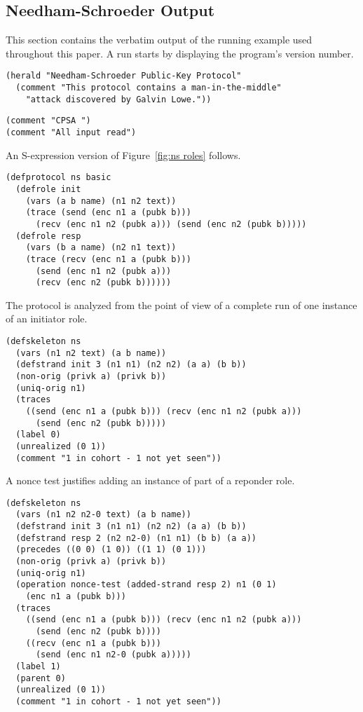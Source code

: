 \documentclass[12pt]{article}
\begin{document}
\subsection{Needham-Schroeder Output}


This section contains the verbatim output of the running example used
throughout this paper.  A run starts by displaying the program's
version number.

\begin{verbatim}
(herald "Needham-Schroeder Public-Key Protocol"
  (comment "This protocol contains a man-in-the-middle"
    "attack discovered by Galvin Lowe."))
\end{verbatim}

\begin{flushleft}
\texttt{(comment "CPSA {\version}")}\\
\texttt{(comment "All input read")}
\end{flushleft}

An S-expression version of Figure~\ref{fig:ns roles} follows.

\begin{verbatim}
(defprotocol ns basic
  (defrole init
    (vars (a b name) (n1 n2 text))
    (trace (send (enc n1 a (pubk b)))
      (recv (enc n1 n2 (pubk a))) (send (enc n2 (pubk b)))))
  (defrole resp
    (vars (b a name) (n2 n1 text))
    (trace (recv (enc n1 a (pubk b)))
      (send (enc n1 n2 (pubk a)))
      (recv (enc n2 (pubk b))))))
\end{verbatim}

The protocol is analyzed from the point of view of a complete run of
one instance of an initiator role.

\begin{verbatim}
(defskeleton ns
  (vars (n1 n2 text) (a b name))
  (defstrand init 3 (n1 n1) (n2 n2) (a a) (b b))
  (non-orig (privk a) (privk b))
  (uniq-orig n1)
  (traces
    ((send (enc n1 a (pubk b))) (recv (enc n1 n2 (pubk a)))
      (send (enc n2 (pubk b)))))
  (label 0)
  (unrealized (0 1))
  (comment "1 in cohort - 1 not yet seen"))
\end{verbatim}

A nonce test justifies adding an instance of part of a reponder role.

\begin{verbatim}
(defskeleton ns
  (vars (n1 n2 n2-0 text) (a b name))
  (defstrand init 3 (n1 n1) (n2 n2) (a a) (b b))
  (defstrand resp 2 (n2 n2-0) (n1 n1) (b b) (a a))
  (precedes ((0 0) (1 0)) ((1 1) (0 1)))
  (non-orig (privk a) (privk b))
  (uniq-orig n1)
  (operation nonce-test (added-strand resp 2) n1 (0 1)
    (enc n1 a (pubk b)))
  (traces
    ((send (enc n1 a (pubk b))) (recv (enc n1 n2 (pubk a)))
      (send (enc n2 (pubk b))))
    ((recv (enc n1 a (pubk b)))
      (send (enc n1 n2-0 (pubk a)))))
  (label 1)
  (parent 0)
  (unrealized (0 1))
  (comment "1 in cohort - 1 not yet seen"))
\end{verbatim}
\end{document}
